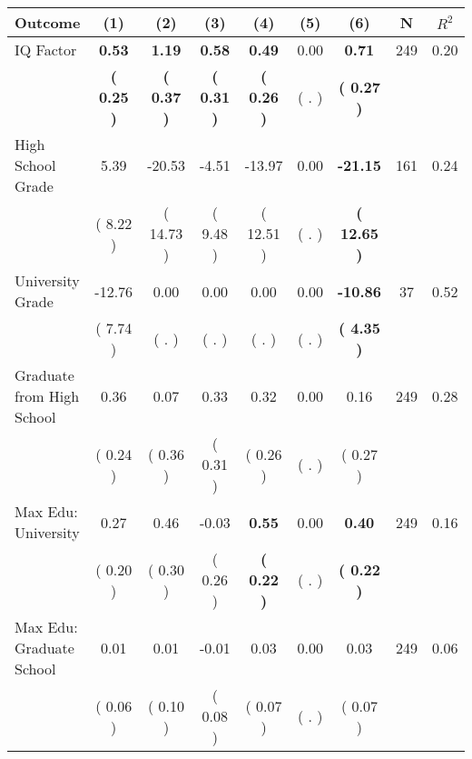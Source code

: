 \begin{tabular}{lcccccccc}
\toprule
 \textbf{Outcome} & \textbf{(1)} & \textbf{(2)} & \textbf{(3)} & \textbf{(4)} & \textbf{(5)} & \textbf{(6)} & \textbf{N} & \textbf{$ R^2$} \\
\midrule
IQ Factor & \textbf{     0.53} & \textbf{     1.19} & \textbf{     0.58} & \textbf{     0.49} &      0.00 & \textbf{     0.71} & 249 &       0.20 \\ 
 & \textbf{(     0.25 )} & \textbf{(     0.37 )} & \textbf{(     0.31 )} & \textbf{(     0.26 )} & (        . ) & \textbf{(     0.27 )} & \\
High School Grade &      5.39 &    -20.53 &     -4.51 &    -13.97 &      0.00 & \textbf{   -21.15} & 161 &       0.24 \\ 
 & (     8.22 ) & (    14.73 ) & (     9.48 ) & (    12.51 ) & (        . ) & \textbf{(    12.65 )} & \\
University Grade &    -12.76 &      0.00 &      0.00 &      0.00 &      0.00 & \textbf{   -10.86} & 37 &       0.52 \\ 
 & (     7.74 ) & (        . ) & (        . ) & (        . ) & (        . ) & \textbf{(     4.35 )} & \\
Graduate from High School &      0.36 &      0.07 &      0.33 &      0.32 &      0.00 &      0.16 & 249 &       0.28 \\ 
 & (     0.24 ) & (     0.36 ) & (     0.31 ) & (     0.26 ) & (        . ) & (     0.27 ) & \\
Max Edu: University &      0.27 &      0.46 &     -0.03 & \textbf{     0.55} &      0.00 & \textbf{     0.40} & 249 &       0.16 \\ 
 & (     0.20 ) & (     0.30 ) & (     0.26 ) & \textbf{(     0.22 )} & (        . ) & \textbf{(     0.22 )} & \\
Max Edu: Graduate School &      0.01 &      0.01 &     -0.01 &      0.03 &      0.00 &      0.03 & 249 &       0.06 \\ 
 & (     0.06 ) & (     0.10 ) & (     0.08 ) & (     0.07 ) & (        . ) & (     0.07 ) & \\
\bottomrule
\end{tabular}
